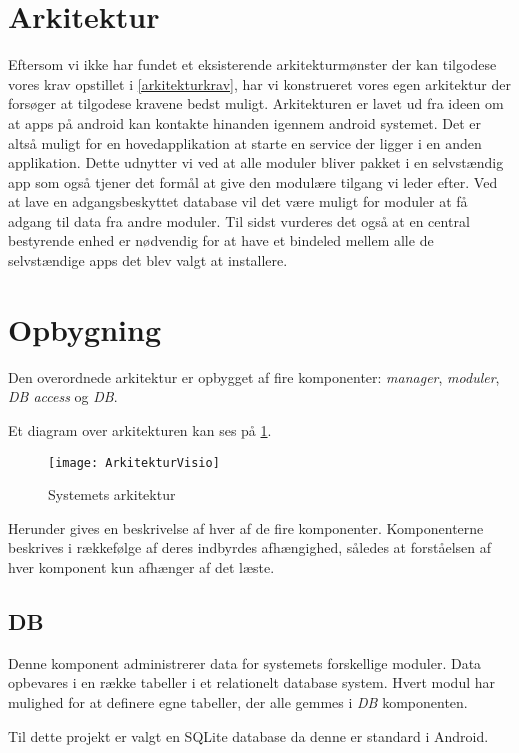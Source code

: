\section{Arkitektur}\label{sec:arkitektur}
Eftersom vi ikke har fundet et eksisterende arkitekturmønster der kan tilgodese vores krav opstillet i \cref{arkitekturkrav}, har vi konstrueret vores egen arkitektur der forsøger at tilgodese kravene bedst muligt.
Arkitekturen er lavet ud fra ideen om at apps på android kan kontakte hinanden igennem android systemet. 
Det er altså muligt for en hovedapplikation at starte en service der ligger i en anden applikation.
Dette udnytter vi ved at alle moduler bliver pakket i en selvstændig app som også tjener det formål at give den modulære tilgang vi leder efter. 
Ved at lave en adgangsbeskyttet database vil det være muligt for moduler at få adgang til data fra andre moduler.
Til sidst vurderes det også at en central bestyrende enhed er nødvendig for at have et bindeled mellem alle de selvstændige apps det blev valgt at installere.

\section*{Opbygning}
Den overordnede arkitektur er opbygget af fire komponenter: \textit{manager}, \textit{moduler}, \textit{DB access} og \textit{DB}.

Et diagram over arkitekturen kan ses på \cref{arkitektur_udkast_1}.
\begin{figure}[h]
	\centering
	\texttt{[image: ArkitekturVisio]}
	\caption{Systemets arkitektur}
  \label{arkitektur_udkast_1}
\end{figure}

Herunder gives en beskrivelse af hver af de fire komponenter.
Komponenterne beskrives i rækkefølge af deres indbyrdes afhængighed, således at forståelsen af hver komponent kun afhænger af det læste.

\subsection*{DB}
Denne komponent administrerer data for systemets forskellige moduler.
Data opbevares i en række tabeller i et relationelt database system.
Hvert modul har mulighed for at definere egne tabeller, der alle gemmes i \textit{DB} komponenten.

Til dette projekt er valgt en SQLite database da denne er standard i Android.



